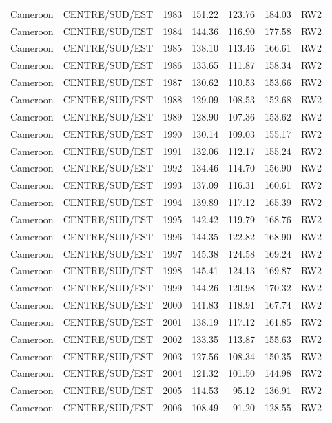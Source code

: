\begin{longtable}{lllrrrl}
  Cameroon & CENTRE/SUD/EST & 1983 & 151.22 & 123.76 & 184.03 & RW2 \\ 
  Cameroon & CENTRE/SUD/EST & 1984 & 144.36 & 116.90 & 177.58 & RW2 \\ 
  Cameroon & CENTRE/SUD/EST & 1985 & 138.10 & 113.46 & 166.61 & RW2 \\ 
  Cameroon & CENTRE/SUD/EST & 1986 & 133.65 & 111.87 & 158.34 & RW2 \\ 
  Cameroon & CENTRE/SUD/EST & 1987 & 130.62 & 110.53 & 153.66 & RW2 \\ 
  Cameroon & CENTRE/SUD/EST & 1988 & 129.09 & 108.53 & 152.68 & RW2 \\ 
  Cameroon & CENTRE/SUD/EST & 1989 & 128.90 & 107.36 & 153.62 & RW2 \\ 
  Cameroon & CENTRE/SUD/EST & 1990 & 130.14 & 109.03 & 155.17 & RW2 \\ 
  Cameroon & CENTRE/SUD/EST & 1991 & 132.06 & 112.17 & 155.24 & RW2 \\ 
  Cameroon & CENTRE/SUD/EST & 1992 & 134.46 & 114.70 & 156.90 & RW2 \\ 
  Cameroon & CENTRE/SUD/EST & 1993 & 137.09 & 116.31 & 160.61 & RW2 \\ 
  Cameroon & CENTRE/SUD/EST & 1994 & 139.89 & 117.12 & 165.39 & RW2 \\ 
  Cameroon & CENTRE/SUD/EST & 1995 & 142.42 & 119.79 & 168.76 & RW2 \\ 
  Cameroon & CENTRE/SUD/EST & 1996 & 144.35 & 122.82 & 168.90 & RW2 \\ 
  Cameroon & CENTRE/SUD/EST & 1997 & 145.38 & 124.58 & 169.24 & RW2 \\ 
  Cameroon & CENTRE/SUD/EST & 1998 & 145.41 & 124.13 & 169.87 & RW2 \\ 
  Cameroon & CENTRE/SUD/EST & 1999 & 144.26 & 120.98 & 170.32 & RW2 \\ 
  Cameroon & CENTRE/SUD/EST & 2000 & 141.83 & 118.91 & 167.74 & RW2 \\ 
  Cameroon & CENTRE/SUD/EST & 2001 & 138.19 & 117.12 & 161.85 & RW2 \\ 
  Cameroon & CENTRE/SUD/EST & 2002 & 133.35 & 113.87 & 155.63 & RW2 \\ 
  Cameroon & CENTRE/SUD/EST & 2003 & 127.56 & 108.34 & 150.35 & RW2 \\ 
  Cameroon & CENTRE/SUD/EST & 2004 & 121.32 & 101.50 & 144.98 & RW2 \\ 
  Cameroon & CENTRE/SUD/EST & 2005 & 114.53 & 95.12 & 136.91 & RW2 \\ 
  Cameroon & CENTRE/SUD/EST & 2006 & 108.49 & 91.20 & 128.55 & RW2 \\ 

\end{longtable}
